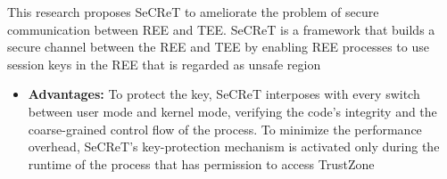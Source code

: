 \documentclass[conference]{IEEEtran}
\begin{document}
\cite{misc9} This research proposes SeCReT to ameliorate the problem of secure communication between REE and TEE. SeCReT is a framework that builds a secure channel between the REE and TEE by enabling REE processes to use session keys in the REE that is regarded as unsafe region
\begin{itemize}
    \item \textbf{Advantages:} To protect the key, SeCReT interposes with every switch between user mode and kernel mode, verifying the code’s integrity and the coarse-grained control flow of the process. To minimize the performance overhead, SeCReT’s key-protection mechanism is activated only during the runtime of the process that has permission to access TrustZone
\end{itemize}
\end{document}
